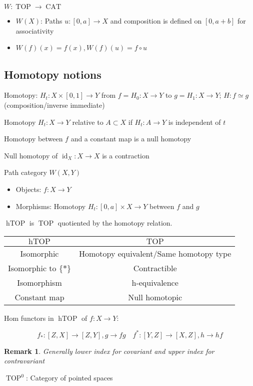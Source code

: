 \documentclass[12pt]{article}
\newtheorem*{rmk}{Remark}
\DeclareMathOperator{\id}{id}
\DeclareMathOperator{\CAT}{CAT}
\DeclareMathOperator{\TOP}{TOP}
\DeclareMathOperator{\hTOP}{hTOP}
\begin{document}
$W:\TOP\to\CAT$
\begin{itemize}
    \item $W(X)$: Paths $u:[0,a]\to X$ and composition is defined on $[0,a+b]$ for associativity
    \item $W(f)(x)=f(x),W(f)(u)=f\circ u$
\end{itemize}

\subsection{Homotopy notions}

Homotopy: $H_t:X\times[0,1]\to Y$ from $f=H_0:X\to Y$ to $g=H_1:X\to Y$; $H:f\simeq g$ (composition/inverse immediate)

Homotopy $H_t:X\to Y$ relative to $A\subset X$ if $H_t:A\to Y$ is independent of $t$

Homotopy between $f$ and a constant map is a null homotopy

Null homotopy of $\id_X:X\to X$ is a contraction

Path category $W(X,Y)$
\begin{itemize}
    \item Objects: $f:X\to Y$
    \item Morphisms: Homotopy $H_t:[0,a]\times X\to Y$ between $f$ and $g$
\end{itemize}

$\hTOP$ is $\TOP$ quotiented by the homotopy relation.

\begin{tabular}{cc}\hline
    $\hTOP$&$\TOP$\\\hline
    Isomorphic&Homotopy equivalent/Same homotopy type\\\hline
    Isomorphic to $\{*\}$&Contractible\\\hline
    Isomorphism&h-equivalence\\\hline
    Constant map&Null homotopic\\\hline
\end{tabular}

Hom functors in $\hTOP$ of $f:X\to Y$:

\[f_*:[Z,X]\to[Z,Y],g\to fg\quad f^*:[Y,Z]\to [X,Z],h\to hf\]

\begin{rmk}
    Generally lower index for covariant and upper index for contravariant
\end{rmk}

$\TOP^0$: Category of pointed spaces
\end{document}
